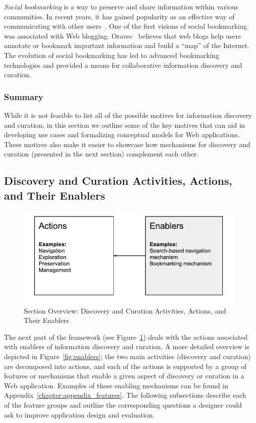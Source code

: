 \documentclass{sigchi}
\begin{document}
{{{\textit{Social bookmarking} is a way to preserve and share information within various communities. In recent years, it has gained popularity as an effective way of communicating with other users~\cite{estelles2010social}. One of the first visions of social bookmarking was associated with Web blogging. Oravec~\cite{oravec2002bookmarking} believes that web blogs help users annotate or bookmark important information and build a ``map'' of the Internet. The evolution of social bookmarking has led to advanced bookmarking technologies and provided a means for collaborative information discovery and curation. 
}
{\subsubsection{Summary}
While it is not feasible to list all of the possible motives for information discovery and curation, in this section we outline some of the key motives that can aid in developing use cases and formalizing conceptual models for Web applications. These motives also make it easier to showcase how mechanisms for discovery and curation (presented in the next section) complement each other.
} 
}

{\subsection{Discovery and Curation Activities, Actions, and Their Enablers}
\label{section:enablers}

\begin{figure}[ht!]
	\noindent
	\centering
    \includegraphics[width=\linewidth]{figures/enablers.pdf}
	\caption{Section Overview: Discovery and Curation Activities, Actions, and Their Enablers}
	\label{fig:enablers_overview} 
\end{figure}
The next part of the framework (see Figure~\ref{fig:enablers_overview}) deals with the actions associated with enablers of information discovery and curation. A more detailed overview is depicted in Figure~\ref{fig:enablers}; the two main activities (discovery and curation) are decomposed into actions, and each of the actions is supported by a group of features or mechanisms that enable a given aspect of discovery or curation in a Web application. Examples of these enabling mechanisms can be found in Appendix~\ref{chapter:appendix_features}. The following subsections describe each of the feature groups and outline the corresponding questions a designer could ask to improve application design and evaluation.  

}}
\end{document}

